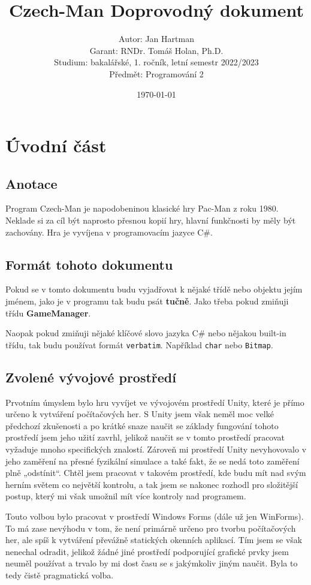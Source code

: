 \documentclass[a4]{article}
\title{Czech-Man
Doprovodný dokument}
\author{Autor: Jan Hartman
\\Garant: RNDr. Tomáš Holan, Ph.D.
\\Studium: bakalářské, 1. ročník, letní semestr 2022/2023
\\Předmět: Programování 2}
\date{\today}
\begin{document}
\maketitle
\tableofcontents
\pagestyle{fancy}
\newpage
\section{Úvodní část}
\subsection{Anotace}
Program Czech-Man je napodobeninou klasické hry Pac-Man z roku 1980. Neklade si za cíl být naprosto přesnou kopií hry, hlavní funkčnosti by měly být zachovány. Hra je vyvíjena v programovacím jazyce C\#.
\subsection{Formát tohoto dokumentu}
Pokud se v tomto dokumentu budu vyjadřovat k nějaké třídě nebo objektu jejím jménem, jako je v programu tak budu psát \textbf{tučně}. Jako třeba pokud zmiňuji třídu \textbf{GameManager}.

Naopak pokud zmiňuji nějaké klíčové slovo jazyka C\# nebo nějakou built-in třídu, tak budu používat formát \verb|verbatim|. Například \verb|char| nebo \verb|Bitmap|.
\subsection{Zvolené vývojové prostředí}
Prvotním úmyslem bylo hru vyvíjet ve vývojovém prostředí Unity, které je přímo určeno k vytváření počítačových her. S Unity jsem však neměl moc velké předchozí zkušenosti a po krátké snaze naučit se základy fungování tohoto prostředí jsem jeho užití zavrhl, jelikož naučit se v tomto prostředí pracovat vyžaduje mnoho specifických znalostí. Zároveň mi prostředí Unity nevyhovovalo v jeho zaměření na přesné fyzikální simulace a také fakt, že se nedá toto zaměření plně „odstínit“. Chtěl jsem pracovat v takovém prostředí, kde budu mít nad svým herním světem co největší kontrolu, a tak jsem se nakonec rozhodl pro složitější postup, který mi však umožnil mít více kontroly nad programem.

Touto volbou bylo pracovat v prostředí Windows Forms (dále už jen WinForms). To má zase nevýhodu v tom, že není primárně určeno pro tvorbu počítačových her, ale spíš k vytváření převážně statických okenních aplikací. Tím jsem se však nenechal odradit, jelikož žádné jiné prostředí podporující grafické prvky jsem neuměl používat a trvalo by mi dost času se s jakýmkoliv jiným naučit. Byla to tedy čistě pragmatická volba.
\newpage
\end{document}

